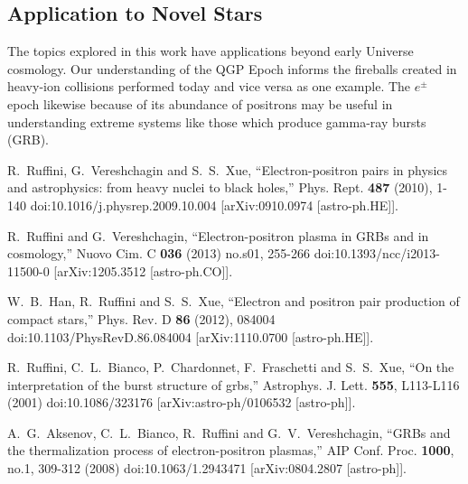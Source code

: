 \documentclass[universe,article,submit,moreauthors,pdftex,a4paper]{Definitions/mdpi}
\begin{document}
\subsection{Application to Novel Stars}
\noindent The topics explored in this work have applications beyond early Universe cosmology. Our understanding of the QGP Epoch informs the fireballs created in heavy-ion collisions performed today and vice versa \cite{Rafelski:2013qeu,Philipsen:2012nu,Braun-Munzinger:2008szb} as one example. The $e^{\pm}$ epoch likewise because of its abundance of positrons may be useful in understanding extreme systems like those which produce gamma-ray bursts (GRB).


\begin{thebibliography}{99}

R.~Ruffini, G.~Vereshchagin and S.~S.~Xue,
``Electron-positron pairs in physics and astrophysics: from heavy nuclei to black holes,''
Phys. Rept. \textbf{487} (2010), 1-140
doi:10.1016/j.physrep.2009.10.004
[arXiv:0910.0974 [astro-ph.HE]].

R.~Ruffini and G.~Vereshchagin,
``Electron-positron plasma in GRBs and in cosmology,''
Nuovo Cim. C \textbf{036} (2013) no.s01, 255-266
doi:10.1393/ncc/i2013-11500-0
[arXiv:1205.3512 [astro-ph.CO]].

W.~B.~Han, R.~Ruffini and S.~S.~Xue,
``Electron and positron pair production of compact stars,''
Phys. Rev. D \textbf{86} (2012), 084004
doi:10.1103/PhysRevD.86.084004
[arXiv:1110.0700 [astro-ph.HE]].

R.~Ruffini, C.~L.~Bianco, P.~Chardonnet, F.~Fraschetti and S.~S.~Xue,
``On the interpretation of the burst structure of grbs,''
Astrophys. J. Lett. \textbf{555}, L113-L116 (2001)
doi:10.1086/323176
[arXiv:astro-ph/0106532 [astro-ph]].

A.~G.~Aksenov, C.~L.~Bianco, R.~Ruffini and G.~V.~Vereshchagin,
``GRBs and the thermalization process of electron-positron plasmas,''
AIP Conf. Proc. \textbf{1000}, no.1, 309-312 (2008)
doi:10.1063/1.2943471
[arXiv:0804.2807 [astro-ph]].



\end{thebibliography}
\end{document}
